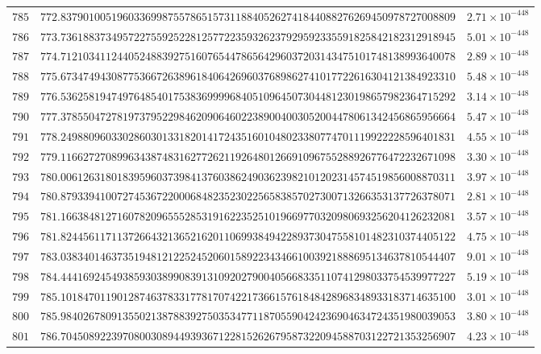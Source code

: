 \documentclass[12pt,reqno]{amsart}
\theoremstyle{remark}
\begin{document}
\begin{longtable}{clc}
$785$ & $772.8379010051960336998755786515731188405262741844088276269450978727008809$ & $2.71\times 10^{-448}$ \\
$786$ & $773.7361883734957227559252281257722359326237929592335591825842182312918945$ & $5.01\times 10^{-448}$ \\
$787$ & $774.7121034112440524883927516076544786564296037203143475101748138993640078$ & $2.89\times 10^{-448}$ \\
$788$ & $775.6734749430877536672638961840642696037689862741017722616304121384923310$ & $5.48\times 10^{-448}$ \\
$789$ & $776.5362581947497648540175383699996840510964507304481230198657982364715292$ & $3.14\times 10^{-448}$ \\
$790$ & $777.3785504727819737952298462090646022389004003052004478061342456865956664$ & $5.47\times 10^{-448}$ \\
$791$ & $778.2498809603302860301331820141724351601048023380774701119922228596401831$ & $4.55\times 10^{-448}$ \\
$792$ & $779.1166272708996343874831627726211926480126691096755288926776472232671098$ & $3.30\times 10^{-448}$ \\
$793$ & $780.0061263180183959603739841376038624903623982101202314574519856008870311$ & $3.97\times 10^{-448}$ \\
$794$ & $780.8793394100727453672200068482352302256583857027300713266353137726378071$ & $2.81\times 10^{-448}$ \\
$795$ & $781.1663848127160782096555285319162235251019669770320980693256204126232081$ & $3.57\times 10^{-448}$ \\
$796$ & $781.8244561171137266432136521620110699384942289373047558101482310374405122$ & $4.75\times 10^{-448}$ \\
$797$ & $783.0383401463735194812122524520601589223434661003921888695134637810544407$ & $9.01\times 10^{-448}$ \\
$798$ & $784.4441692454938593038990839131092027900405668335110741298033754539977227$ & $5.19\times 10^{-448}$ \\
$799$ & $785.1018470119012874637833177817074221736615761848428968348933183714635100$ & $3.01\times 10^{-448}$ \\
$800$ & $785.9840267809135502138788392750353477118705590424236904634724351980039053$ & $3.80\times 10^{-448}$ \\
$801$ & $786.7045089223970800308944939367122815262679587322094588703122721353256907$ & $4.23\times 10^{-448}$ \\

\end{longtable}
\end{document}
